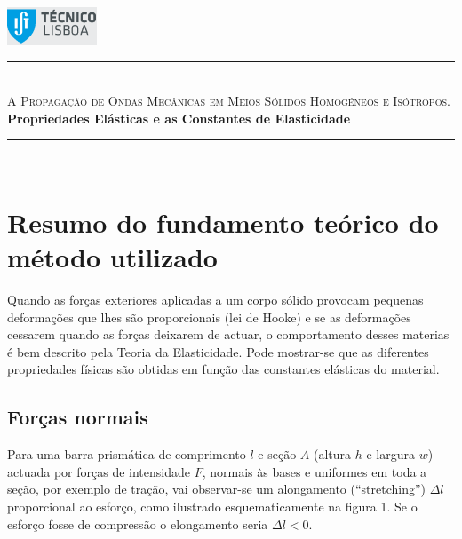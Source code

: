 \documentclass[a4paper,12pt]{article}
\author{Prof. Bernardo B. Carvalho}
\date{ Outubro 2012}
\newcommand{\HRule}{\rule{\linewidth}{0.5mm}}
\begin{document}
 

	\includegraphics[width=0.2\textwidth]{../logo-ist}%

	\HRule \\[0.5cm]
	{ \huge \sf  \textsc{A Propagação de Ondas Mecânicas em Meios Sólidos Homogéneos e Isótropos.}} \\[0.4cm] %
	{ \large \bfseries Propriedades Elásticas e as Constantes de Elasticidade}\\
	\HRule \\%

\section{\sf Resumo do fundamento teórico do método utilizado}
Quando as forças exteriores aplicadas a um corpo sólido provocam pequenas deformações que lhes são proporcionais (lei de Hooke) e se as deformações cessarem quando as forças deixarem de actuar, o comportamento desses materias é bem descrito pela Teoria da Elasticidade. Pode mostrar-se que as diferentes propriedades físicas são obtidas em função das constantes elásticas do material.

\subsection{\sf Forças normais }

Para uma barra prismática de comprimento $l$ e seção $A$ (altura $h$ e largura $w$) actuada por forças de intensidade $F$, normais às bases e uniformes em toda a seção, por exemplo de tração, vai observar-se um alongamento (“stretching”) $\Delta l$ proporcional ao esforço, como ilustrado esquematicamente na figura 1. Se o esforço fosse de compressão o elongamento seria $\Delta l<0$. 
\end{document}
